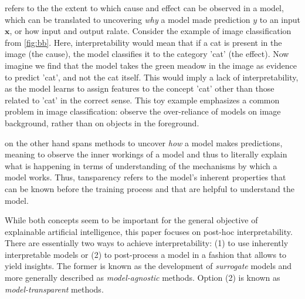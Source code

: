  refers to the the extent to which cause and effect can be observed in a model, which can be translated to uncovering \textit{why} a model made prediction $y$ to an input $\mathbf{x}$, or how input and output ralate. Consider the example of image classification from \autoref{fig:bb}. Here, interpretability would mean that if a cat is present in the image (the cause), the model classifies it to the category 'cat' (the effect). Now imagine we find that the model takes the green meadow in the image as evidence to predict 'cat', and not the cat itself. This would imply a lack of interpretability, as the model learns to assign features to the concept 'cat' other than those related to 'cat' in the correct sense. This toy example emphasizes a common problem in image classification: \cite{xiao2020noise} observe the over-reliance of models on image background, rather than on objects in the foreground. %

 on the other hand spans methods to uncover \textit{how} a model makes predictions, meaning to observe the inner workings of a model and thus to literally explain what is happening in terms of understanding of the mechanisms by which a model works. Thus, tansparency refers to the model's inherent properties that can be known before the training process and that are helpful to understand the model.

\par\smallskip\vspace*{-0.3cm}
While both concepts seem to be important for the general objective of explainable artificial intelligence, this paper focuses on post-hoc interpretability.
There are essentially two ways to achieve interpretability: (1) to use inherently interpretable models or (2) to post-process a model in a fashion that allows to yield insights. The former is known as the development of \textit{surrogate} models and more generally described as \textit{model-agnostic} methods. Option (2) is known as \textit{model-transparent} methods. 

